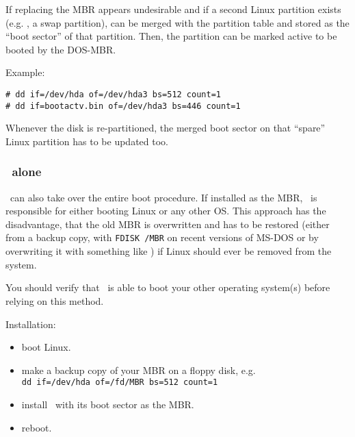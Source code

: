 If replacing the MBR appears undesirable and if a second Linux partition
exists (e.g. ,  a swap partition), 
can be merged with
the partition table and stored as the ``boot sector'' of that partition.
Then, the partition can be marked active to be booted by the DOS-MBR.

Example:
\begin{verbatim}
# dd if=/dev/hda of=/dev/hda3 bs=512 count=1
# dd if=bootactv.bin of=/dev/hda3 bs=446 count=1
\end{verbatim}

 Whenever the disk is re-partitioned, the merged boot
sector on that ``spare'' Linux partition has to be updated too.


\subsubsection{\LILO\ alone}


\LILO\ can also take over the entire boot procedure. If installed as the MBR,
\LILO\ is responsible for either booting Linux or any other OS. This approach
has the disadvantage, that the old MBR is overwritten and has to be restored
(either from a backup copy, with \verb"FDISK /MBR" on recent versions of
MS-DOS or by overwriting it with something like ) if Linux
should ever be removed from the system.

You should verify that \LILO\ is able to boot your other operating system(s)
before relying on this method.

Installation:
\begin{itemize}
  \item boot Linux.
  \item make a backup copy of your MBR on a floppy disk, e.g. \\
    \verb"dd if=/dev/hda of=/fd/MBR bs=512 count=1"
  \item install \LILO\ with its boot sector as the MBR.
  \item reboot.
\end{itemize}

